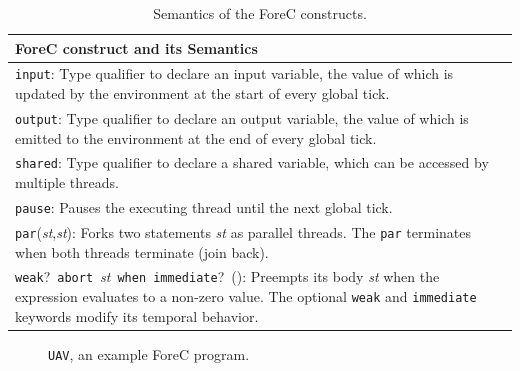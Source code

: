\begin{table}[t]
	\centering
	\renewcommand{\arraystretch}{1.25}		

	\begin{tabular}{| p{\textwidth} |}
		\hline
		\textbf{ForeC construct and its Semantics}										\\ 
		\hline
		\verb$input$:
			Type qualifier to declare an input variable, the value of which is updated 
			by the environment at the start of every global tick.						\\ \hline
		\verb$output$:
			Type qualifier to declare an output variable, the value of which is emitted 
			to the environment at the end of every global tick.							\\ \hline
		\verb$shared$:
			Type qualifier to declare a shared variable, which can be accessed by 
			multiple threads.															\\ \hline
		\verb$pause$:
			Pauses the executing thread until the next global tick.						\\ \hline
		\verb$par$(\emph{st},\emph{st}):
			Forks two statements \emph{st} as parallel threads. The 
			\verb$par$ terminates when both threads terminate (join back).				\\ \hline
		\verb$weak$?~\verb$abort$~\emph{st}~\verb$when immediate$?~(\expression{}):
			Preempts its body \emph{st} when the expression \expression{} evaluates to 
			a non-zero value. The optional \verb$weak$ and \verb$immediate$ keywords 
			modify its temporal behavior.												\\
		\hline
	\end{tabular}

	\caption{Semantics of the ForeC constructs.}
	\label{table:forec_semantics}
\end{table}

\begin{figure}
	\centering

	\begin{minipage}[t]{0.75\columnwidth}
		
	\end{minipage}

	\caption{\texttt{UAV}, an example ForeC program.}
	\label{fig:forec_uav}
\end{figure}

